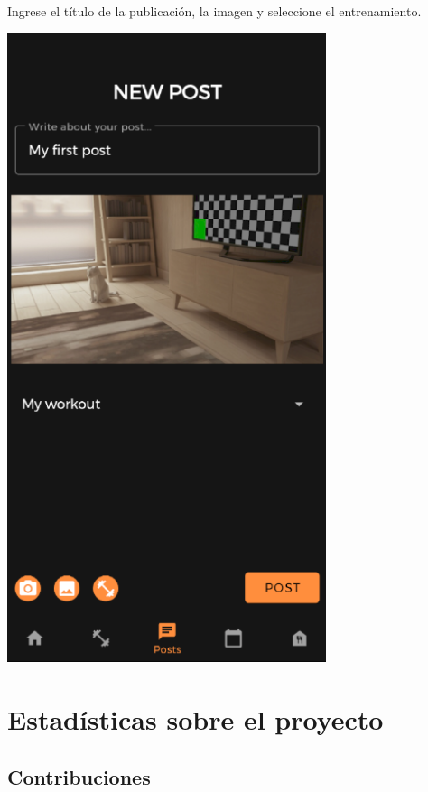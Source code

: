 \documentclass[12pt,a4paper]{article}
\begin{document}
\begin{enumerate}
\begin{minipage}{.60\textwidth}
  \item Ingrese el título de la publicación, la imagen y seleccione el entrenamiento.
\end{minipage}
\begin{minipage}{.40\textwidth}
  \includegraphics[width=0.7\textwidth, right]{crearpost}
\end{minipage}

\end{enumerate}



\clearpage

\section{Estadísticas sobre el proyecto}

\subsection{Contribuciones}
\end{document}
